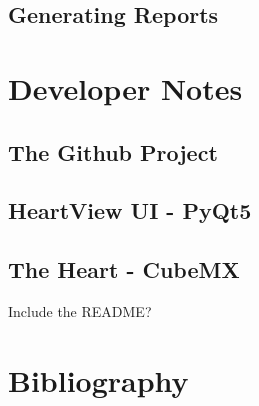 \documentclass[11pt,fleqn]{book} %
\begin{document}


\section{Generating Reports}







\chapter{Developer Notes}


\section{The Github Project}


\section{HeartView UI - PyQt5}


\section{The Heart - CubeMX}

Include the README?



\chapter*{Bibliography}
\end{document}
